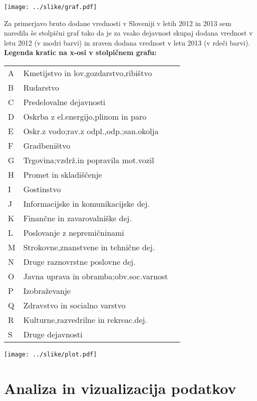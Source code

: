 \documentclass[a4paper, 11pt]{article}
\begin{document}
\begin{center}
\texttt{[image: ../slike/graf.pdf]}
\end{center}






Za primerjavo bruto dodane vrednosti v Sloveniji v letih 2012 in 2013 sem naredila še stolpični graf tako da je za vsako dejavnost skupaj dodana vrednost v letu 2012 (v  modri barvi) in zraven dodana vrednost v letu 2013 (v rdeči barvi). 
\newline
\textbf{Legenda kratic na x-osi v stolpičnem grafu:}
\begin{table}[h]
\begin{tabular}{lll}
A  & Kmetijstvo in lov,gozdarstvo,ribištvo \\
B & Rudarstvo  \\
C & Predelovalne dejavnosti  \\
D & Oskrba z el.energijo,plinom in paro	\\
E & Oskr.z vodo;rav.z odpl.,odp.;san.okolja	\\
F & Gradbeništvo	\\
G & Trgovina;vzdrž.in popravila mot.vozil	\\
H & Promet in skladiščenje	\\
I & Gostinstvo	\\
J & Informacijske in komunikacijske dej.\\	
K & Finančne in zavarovalniške dej.	\\
L & Poslovanje z nepremičninami	\\
M & Strokovne,znanstvene in tehnične dej.	\\
N & Druge raznovrstne poslovne dej.	\\
O & Javna uprava in obramba;obv.soc.varnost \\
P & Izobraževanje	\\
Q & Zdravstvo in socialno varstvo	\\
R & Kulturne,razvedrilne in rekreac.dej.\\	
S & Druge dejavnosti
\end{tabular}
\end{table}


\begin{center}

\texttt{[image: ../slike/plot.pdf]}

\end{center}


\section{Analiza in vizualizacija podatkov}
\end{document}

